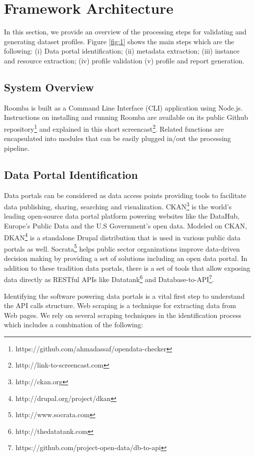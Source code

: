 \documentclass{sig-alternate}
\begin{document}
\section{Framework Architecture}

In this section, we provide an overview of the processing steps for validating and generating dataset profiles. Figure \ref{fig:1} shows the main steps which are the following: (i) Data portal identification; (ii) metadata extraction; (iii) instance and resource extraction; (iv) profile validation (v) profile and report generation.

\subsection{System Overview}

Roomba is built as a Command Line Interface (CLI) application using Node.js. Instructions on installing and running Roomba are available on its public Github repository\footnote{https://github.com/ahmadassaf/opendata-checker} and explained in this short screencast\footnote{http://link-to-screencast.com}. Related functions are encapsulated into modules that can be easily plugged in/out the processing pipeline.

\subsection{Data Portal Identification}

Data portals can be considered as data access points providing tools to facilitate data publishing, sharing, searching and visualization. CKAN\footnote{http://ckan.org} is the world's leading open-source data portal platform powering websites like the DataHub, Europe's Public Data and the U.S Government's open data. Modeled on CKAN, DKAN\footnote{http://drupal.org/project/dkan} is a standalone Drupal distribution that is used in various public data portals as well. Socrata\footnote{http://www.socrata.com} helps public sector organizations improve data-driven decision making by providing a set of solutions including an open data portal. In addition to these tradition data portals, there is a set of tools that allow exposing data directly as RESTful APIs like Datatank\footnote{http://thedatatank.com} and Database-to-API\footnote{https://github.com/project-open-data/db-to-api}.

Identifying the software powering data portals is a vital first step to understand the API calls structure. Web scraping is a technique for extracting data from Web pages. We rely on several scraping techniques in the identification process which includes a combination of the following:
\end{document}
